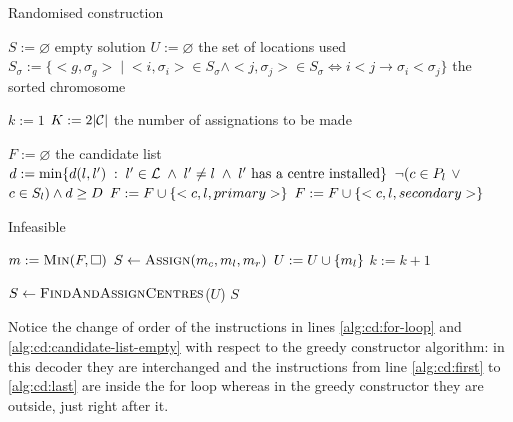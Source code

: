 \begin{algorithm}[H]
    \label{alg:chromosome-decoder}
    \DontPrintSemicolon
    
    \caption{Randomised construction}
    
     {
        $S := \varnothing$ empty solution \;
        $U := \varnothing$ the set of locations used\;
        $S_\sigma := \{<g, \sigma_g> \; | \;
            <i, \sigma_i> \in S_\sigma \wedge <j, \sigma_j> \in S_\sigma \iff
            i < j \rightarrow \sigma_i < \sigma_j \}$ the sorted chromosome\;
            
        $k := 1$\;
        $K := 2|\mathcal{C}|$ the number of assignations to be made\;
         {
            
             { \label{alg:cd:for-loop}
            
                $F := \varnothing$ the candidate list \label{alg:cd:candidate-list-empty} \;
                \For {$\iloc \in \loc$} {
                    $d := \text{min}
                        \{
                        d(l, l') \; : \;
                            l' \in \mathcal{L} \; \wedge \; 
                            l' \neq l \; \wedge \; 
                            l' \text{ has a centre installed}
                        \}
                    $\;
                    \If
                    {$\neg (c \in P_l$ $\vee$ $c \in S_l) \wedge d \ge D$
                    }
                    {
                         {
                            $F := F \cup \{<c, l, primary>\}$
                        }
                         {
                            $F := F \cup \{<c, l, secondary>\}$
                        }
                    }
                }
                
                 {
                    \Return Infeasible\label{alg:cd:return-infeasible}
                }
                
                $m := \textsc{Min}(F, \Box)$ \label{alg:cd:first} \;
                $S \leftarrow \textsc{Assign}(m_c, m_l, m_r)$\;
                $U := U \cup \{ m_l \}$\;
                $k := k + 1$ \label{alg:cd:last} \;
            }
        }
        $S \leftarrow \textsc{FindAndAssignCentres}$($U$)\;
        \Return $S$\;
    }
\end{algorithm}

\hfill

Notice the change of order of the instructions in lines \ref{alg:cd:for-loop} and
\ref{alg:cd:candidate-list-empty} with respect to the greedy constructor algorithm: in this
decoder they are interchanged and the instructions from line \ref{alg:cd:first} to
\ref{alg:cd:last} are inside the for loop whereas in the greedy constructor they are outside,
just right after it.

